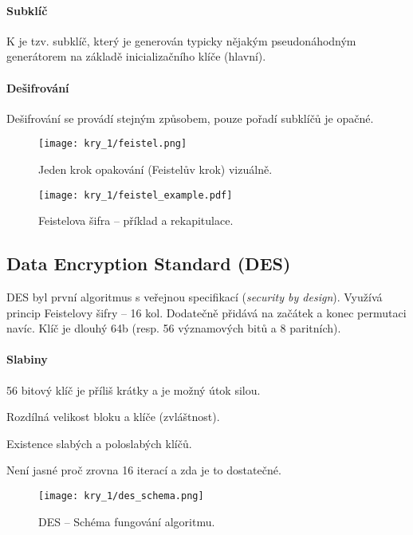 \paragraph*{Subklíč} K je tzv. subklíč, který je generován typicky nějakým pseudonáhodným generátorem na základě inicializačního klíče (hlavní).

\paragraph*{Dešifrování} Dešifrování se provádí stejným způsobem, pouze pořadí subklíčů je opačné.

\begin{figure}[H]
    \centering
    \texttt{[image: kry\_1/feistel.png]}
    \caption{Jeden krok opakování (Feistelův krok) vizuálně.}
\end{figure}

\begin{figure}[H]
    \centering
    \texttt{[image: kry\_1/feistel\_example.pdf]}
    \caption{Feistelova šifra -- příklad a rekapitulace.}
\end{figure}

\subsection*{Data Encryption Standard (DES)}

DES byl první algoritmus s veřejnou specifikací (\textit{security by design}). Využívá princip Feistelovy šifry -- 16 kol. Dodatečně přidává na začátek a konec permutaci navíc. Klíč je dlouhý 64b (resp. 56 významových bitů a 8 paritních).

\paragraph*{Slabiny} \begin{compactitem}
    \item 56 bitový klíč je příliš krátky a je možný útok silou.
    \item Rozdílná velikost bloku a klíče (zvláštnost).
    \item Existence slabých a poloslabých klíčů.
    \item Není jasné proč zrovna 16 iterací a zda je to dostatečné.
\end{compactitem}

\begin{figure}[H]
    \centering
    \texttt{[image: kry\_1/des\_schema.png]}
    \caption{DES -- Schéma fungování algoritmu.}
\end{figure}

